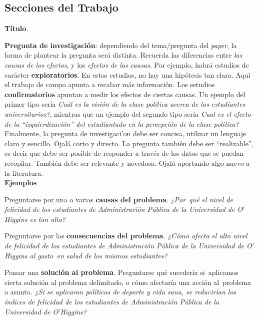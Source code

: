 \documentclass[letterpaper]{article}
\renewenvironment{itemize}{
  \begin{list}{}{
    \setlength{\leftmargin}{1.5em}
  }
}{
  \end{list}
}
\begin{document}
\subsection*{Secciones del Trabajo}

\begin{enumerate}
	\item {\bf T\'itulo}.
	\item {\bf Pregunta de investigaci\'on}: dependiendo del tema/pregunta del \emph{paper}, la forma de plantear la pregunta ser\'a distinta. Recuerda las diferencias entre \emph{las causas de los efectos}, y los \emph{efectos de las causas}. Por ejemplo, habr\'a estudios de car\'acter {\bf exploratorios}. En estos estudios, no hay una hip\'otesis tan clara. Aqu\'i el trabajo de campo apunta a recabar m\'as informaci\'on. Los estudios {\bf confirmatorios} apuntan a medir los efectos de ciertas causas. Un ejemplo del primer tipo ser\'ia \emph{Cu\'al es la visi\'on de la clase pol\'itica acerca de los estudiantes universitarios?}, mientras que un ejemplo del segundo tipo ser\'ia \emph{Cual es el efecto de la ``izquierdizaci\'on'' del estudiantado en la percepci\'on de la clase pol\'itica?} Finalmente, la pregunta de investigaci'on debe ser concisa, utilizar un lenguaje claro y sencillo. Ojal\'a corto y directo. La pregunta tambi\'en debe ser ``realizable'', es decir que debe ser posible de responder a trav\'es de los datos que se puedan recopilar. Tambi\'en debe ser relevante y novedosa. Ojal\'a aportando algo nuevo a la literatura.\\


{\bf Ejemplos}

\begin{itemize}
	\item[-] Preguntarse por una o varias {\bf causas del problema}.  \emph{¿Por qu\'e el nivel de felicidad de los estudiantes de Administraci\'on P\'ublica de la Universidad de O$'$Higgins es tan alto?}
	\item[-] Preguntarse por las {\bf consecuencias del problema}. \emph{¿C\'omo afecta el alto nivel de felicidad de los estudiantes de Administraci\'on P\'ublica de la Universidad de O$'$Higgins al gasto en salud de los mismos estudiantes?}
	\item[-] Pensar una {\bf soluci\'on al problema}. Preguntarse qu\'e suceder\'ia si aplicamos cierta soluci\'on al problema delimitado, o c\'omo afectar\'ia una acci\'on al problema o asunto. \emph{¿Si se aplicaran pol\'iticas de deporte y vida sana, se reducir\'ian los \'indices de felicidad de los estudiantes de Administraci\'on P\'ublica de la Universidad de O$'$Higgins?}
	

\end{itemize}
\end{enumerate}
\end{document}
